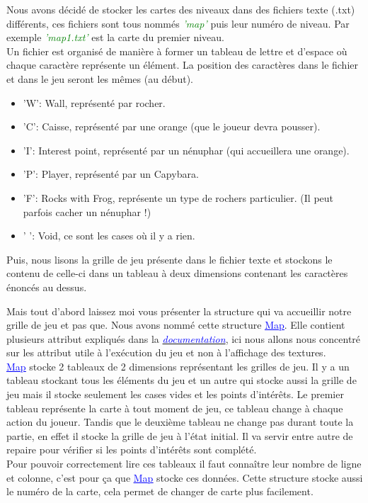 \documentclass[french, 12pt]{article}
\begin{document}
       Nous avons décidé de stocker les cartes des niveaux dans des fichiers texte (.txt) différents, ces fichiers sont tous nommés \textcolor{green}{\textit{'map'}} puis leur numéro de niveau. Par exemple \textcolor{green}{\textit{'map1.txt'}} est la carte du premier niveau. \\
       Un fichier est organisé de manière à former un tableau de lettre et d'espace où chaque caractère représente un élément. La position des caractères dans le fichier et dans le jeu seront les mêmes (au début).
       \begin{itemize}
           \item 'W': Wall, représenté par rocher.
           \item 'C': Caisse, représenté par une orange (que le joueur devra pousser).
           \item 'I': Interest point, représenté par un nénuphar (qui accueillera une orange).
           \item 'P': Player, représenté par un Capybara.
           \item 'F': Rocks with Frog, représente un type de rochers particulier. (Il peut parfois cacher un nénuphar !)
           \item ' ': Void, ce sont les cases où il y a rien.\\
       \end{itemize}


       Puis, nous lisons la grille de jeu présente dans le fichier texte et stockons le contenu de celle-ci dans un tableau à deux dimensions contenant les caractères énoncés au dessus.

       Mais tout d'abord laissez moi vous présenter la structure qui va accueillir notre grille de jeu et pas que. Nous avons nommé cette structure \href{../doc/html/struct_map.html}{\textcolor{blue}{\underline{Map}}}. Elle contient plusieurs attribut expliqués dans la \href{../doc/html/struct_map.html}{\textcolor{blue}{\textit{documentation}}}, ici nous allons nous concentré sur les attribut utile à l'exécution du jeu et non à l'affichage des textures. \\


       \href{../doc/html/struct_map.html}{\textcolor{blue}{\underline{Map}}} stocke 2 tableaux de 2 dimensions représentant les grilles de jeu. Il y a un tableau stockant tous les éléments du jeu et un autre qui stocke aussi la grille de jeu mais il stocke seulement les cases vides et les points d'intérêts. Le premier tableau représente la carte à tout moment de jeu, ce tableau change à chaque action du joueur. Tandis que le deuxième tableau ne change pas durant toute la partie, en effet il stocke la grille de jeu à l'état initial. Il va servir entre autre de repaire pour vérifier si les points d'intérêts sont complété.\\
       Pour pouvoir correctement lire ces tableaux il faut connaître leur nombre de ligne et colonne, c'est pour ça que \href{../doc/html/struct_map.html}{\textcolor{blue}{\underline{Map}}} stocke ces données. Cette structure stocke aussi le numéro de la carte, cela permet de changer de carte plus facilement.
\end{document}
